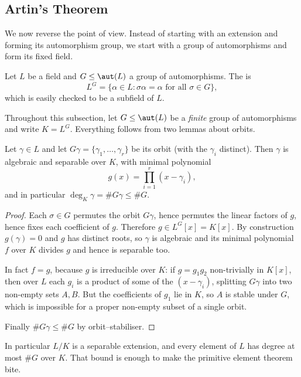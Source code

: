\subsection{Artin's Theorem}

We now reverse the point of view. Instead of starting with an extension and forming its automorphism group, we start with a group of automorphisms and form its fixed field.

\begin{definition}
	Let $L$ be a field and $G \leq \aut(L)$ a group of automorphisms. The  is
	$$L^G = \{\alpha \in L : \sigma\alpha = \alpha \text{ for all } \sigma \in G\},$$
	which is easily checked to be a subfield of $L$.
\end{definition}

Throughout this subsection, let $G \leq \aut(L)$ be a \emph{finite} group of automorphisms and write $K = L^G$. Everything follows from two lemmas about orbits.

\begin{lemma}\label{lem:orbitminpoly}
	Let $\gamma \in L$ and let $G\gamma = \{\gamma_1, \dots, \gamma_r\}$ be its orbit (with the $\gamma_i$ distinct). Then $\gamma$ is algebraic and separable over $K$, with minimal polynomial
	$$g(x) = \prod_{i=1}^r (x - \gamma_i),$$
	and in particular $\deg_K \gamma = \#G\gamma \leq \#G$.
\end{lemma}

\begin{proof}
	Each $\sigma \in G$ permutes the orbit $G\gamma$, hence permutes the linear factors of $g$, hence fixes each coefficient of $g$. Therefore $g \in L^G[x] = K[x]$. By construction $g(\gamma) = 0$ and $g$ has distinct roots, so $\gamma$ is algebraic and its minimal polynomial $f$ over $K$ divides $g$ and hence is separable too.

	In fact $f = g$, because $g$ is irreducible over $K$: if $g = g_1g_2$ non-trivially in $K[x]$, then over $L$ each $g_i$ is a product of some of the $(x-\gamma_i)$, splitting $G\gamma$ into two non-empty sets $A, B$. But the coefficients of $g_1$ lie in $K$, so $A$ is stable under $G$, which is impossible for a proper non-empty subset of a single orbit.

	Finally $\#G\gamma \leq \#G$ by orbit--stabiliser.
\end{proof}

In particular $L/K$ is a separable extension, and every element of $L$ has degree at most $\#G$ over $K$. That bound is enough to make the primitive element theorem bite.

